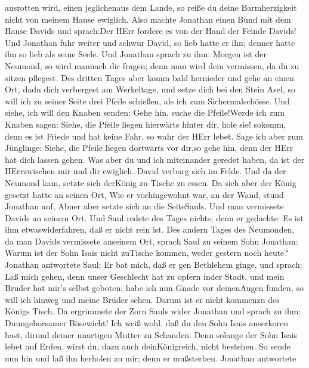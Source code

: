 ausrotten wird, einen jeglichenaus dem Lande, so reiße du deine
Barmherzigkeit nicht von meinem Hause ewiglich.  Also
machte Jonathan einen Bund mit dem Hause Davids und sprach:Der HErr
fordere es von der Hand der Feinde Davids!  Und Jonathan
fuhr weiter und schwur David, so lieb hatte er ihn; denner hatte ihn so
lieb als seine Seele.  Und Jonathan sprach zu ihm: Morgen
ist der Neumond, so wird mannach dir fragen; denn man wird dein
vermissen, da du zu sitzen pflegest.  Des dritten Tages
aber komm bald hernieder und gehe an einen Ort, dadu dich verbergest am
Werkeltage, und setze dich bei den Stein Asel,  so will ich
zu seiner Seite drei Pfeile schießen, als ich zum Sichermalschösse.
 Und siehe, ich will den Knaben senden: Gehe hin, suche die
Pfeile!Werde ich zum Knaben sagen: Siehe, die Pfeile liegen hierwärts
hinter dir, hole sie! sokomm, denn es ist Friede und hat keine Fahr, so
wahr der HErr lebet.  Sage ich aber zum Jünglinge: Siehe,
die Pfeile liegen dortwärts vor dir,so gehe hin, denn der HErr hat dich
lassen gehen.  Was aber du und ich miteinander geredet
haben, da ist der HErrzwischen mir und dir ewiglich.  David
verbarg sich im Felde. Und da der Neumond kam, setzte sich derKönig zu
Tische zu essen.  Da sich aber der König gesetzt hatte an
seinen Ort, Wie er vorhingewohnt war, an der Wand, stund Jonathan auf,
Abner aber setzte sich an die SeiteSauls. Und man vermissete Davids an
seinem Ort.  Und Saul redete des Tages nichts; denn er
gedachte: Es ist ihm etwaswiderfahren, daß er nicht rein ist.
 Des andern Tages des Neumonden, da man Davids vermissete
anseinem Ort, sprach Saul zu seinem Sohn Jonathan: Warum ist der Sohn
Isais nicht zuTische kommen, weder gestern noch heute? 
Jonathan antwortete Saul: Er bat mich, daß er gen Bethlehem ginge,
 und sprach: Laß mich gehen, denn unser Geschlecht hat zu
opfern inder Stadt, und mein Bruder hat mir's selbst geboten; habe ich
nun Gnade vor deinenAugen funden, so will ich hinweg und meine Brüder
sehen. Darum ist er nicht kommenzu des Königs Tisch.  Da
ergrimmete der Zorn Sauls wider Jonathan und sprach zu ihm:
Duungehorsamer Bösewicht! Ich weiß wohl, daß du den Sohn Isais
auserkoren hast, dirund deiner unartigen Mutter zu Schanden.
 Denn solange der Sohn Isais lebet auf Erden, wirst du,
dazu auch deinKönigreich, nicht bestehen. So sende nun hin und laß ihn
herholen zu mir; denn er mußsterben.  Jonathan antwortete

